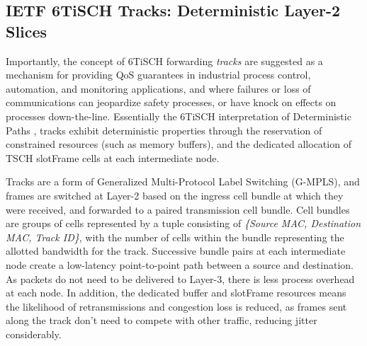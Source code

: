 

\subsection{IETF 6TiSCH Tracks: Deterministic Layer-2 Slices}

Importantly, the concept of 6TiSCH forwarding \textit{tracks} are suggested as a mechanism for providing QoS guarantees in industrial process control, automation, and monitoring applications, and where failures or loss of communications can jeopardize safety processes, or have knock on effects on processes down-the-line. Essentially the 6TiSCH interpretation of Deterministic Paths \cite{6tisch_ietf_architecture,ietf_detnet}, tracks exhibit deterministic properties through the reservation of constrained resources (such as memory buffers), and the dedicated allocation of TSCH slotFrame cells at each intermediate node. 

Tracks are a form of Generalized Multi-Protocol Label Switching (G-MPLS), and frames are switched at Layer-2 based on the ingress cell bundle at which they were received, and forwarded to a paired transmission cell bundle. Cell bundles are groups of cells represented by a tuple consisting of \textit{\{Source MAC, Destination MAC, Track ID\}}, with the number of cells within the bundle representing the allotted bandwidth for the track. Successive bundle pairs at each intermediate node create a low-latency point-to-point path between a source and destination. As packets do not need to be delivered to Layer-3, there is less process overhead at each node. In addition, the dedicated buffer and slotFrame resources means the likelihood of retransmissions and congestion loss is reduced, as frames sent along the track don't need to compete with other traffic, reducing jitter considerably. 

